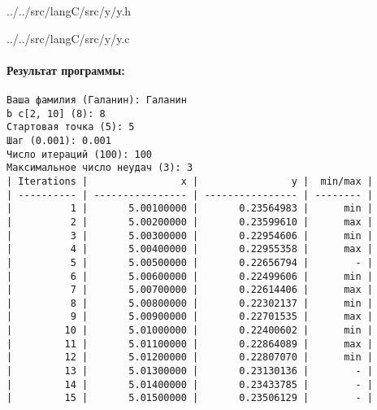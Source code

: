 \newpage



{../../src/langC/src/y/y.h}


{../../src/langC/src/y/y.c}


\paragraph{Результат программы:} \hspace{0pt}

\begin{lstlisting}[language=Out,]
Ваша фамилия (Галанин): Галанин
b c[2, 10] (8): 8
Стартовая точка (5): 5
Шаг (0.001): 0.001
Число итераций (100): 100
Максимальное число неудач (3): 3
| Iterations |                x |                y |  min/max |
| ---------- | ---------------- | ---------------- | -------- |
|          1 |       5.00100000 |       0.23564983 |      min |
|          2 |       5.00200000 |       0.23599610 |      max |
|          3 |       5.00300000 |       0.22954606 |      min |
|          4 |       5.00400000 |       0.22955358 |      max |
|          5 |       5.00500000 |       0.22656794 |        - |
|          6 |       5.00600000 |       0.22499606 |      min |
|          7 |       5.00700000 |       0.22614406 |      max |
|          8 |       5.00800000 |       0.22302137 |      min |
|          9 |       5.00900000 |       0.22701535 |      max |
|         10 |       5.01000000 |       0.22400602 |      min |
|         11 |       5.01100000 |       0.22864089 |      max |
|         12 |       5.01200000 |       0.22807070 |      min |
|         13 |       5.01300000 |       0.23130136 |        - |
|         14 |       5.01400000 |       0.23433785 |        - |
|         15 |       5.01500000 |       0.23506129 |        - |    
\end{lstlisting}
